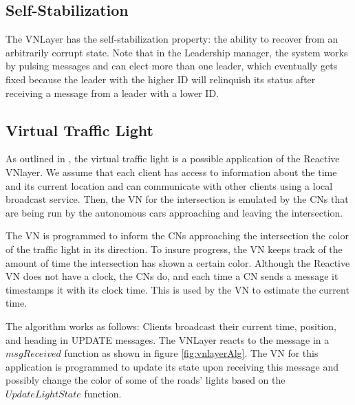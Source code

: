 \documentclass[12pt]{article}
\begin{document}
\subsection{Self-Stabilization}
The VNLayer has the self-stabilization property:  the ability to recover from an arbitrarily corrupt state\cite{ssvnlayer}.  Note that in the Leadership manager, the system works by pulsing messages and can elect more than one leader, which eventually gets fixed because the leader with the higher ID will relinquish its status after receiving a message from a leader with a lower ID. 
\subsection{Virtual Traffic Light}
As outlined in \cite{vnlayer}, the virtual traffic light is a possible application of the Reactive VNlayer.  We assume that each client has access to information about the time and its current location and can communicate with other clients using a local broadcast service. Then, the VN for the intersection is emulated by the CNs that are being run by the autonomous cars approaching and leaving the intersection. 

The VN is programmed to inform the CNs approaching the intersection the color of the traffic light in its direction.  To insure progress, the VN keeps track of the amount of time the intersection has shown a certain color.  Although the Reactive VN does not have a clock, the CNs do, and each time a CN sends a message it timestamps it with its clock time.  This is used by the VN to estimate the current time.   

The algorithm works as follows:  Clients broadcast their current time, position, and heading in UPDATE messages.  The VNLayer reacts to the message in a $msgReceived$ function as shown in figure \ref{fig:vnlayerAlg}.  The VN for this application is programmed to update its state upon receiving this message and possibly change the color of some of the roads' lights based on the $UpdateLightState$ function. 
\end{document}
